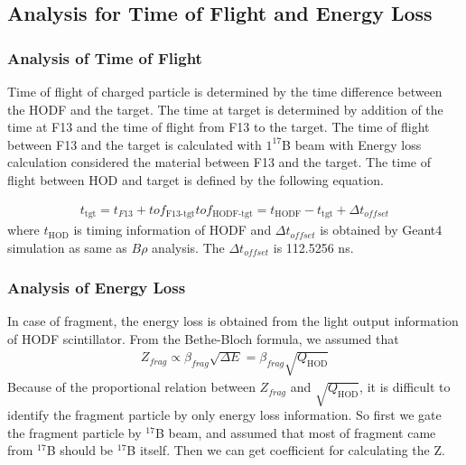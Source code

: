 \subsection{Analysis for Time of Flight and Energy Loss}
\subsubsection{Analysis of Time of Flight}
Time of flight of charged particle is determined by the time difference between the HODF and the target. The time at target is determined by addition of the time at F13 and the time of flight from F13 to the target. The time of flight between F13 and the target is calculated with ${}1^{17}$B beam with Energy loss calculation considered the material between F13 and the target. The time of flight between HOD and target is defined by the following equation.

\begin{align}
    t_{\text{tgt}} = t_{F13} + tof_{\text{F13-tgt}}
    tof_{\text{HODF-tgt}} = t_{\text{HODF}} - t_{\text{tgt}} + \Delta t_{offset}
\end{align}
where $t_{\text{HOD}}$ is timing information of HODF and $\Delta t_{offset}$ is obtained by Geant4 simulation as same as $B\rho$ analysis. The $\Delta t_{offset}$ is 112.5256 ns.

\subsubsection{Analysis of Energy Loss}
In case of fragment, the energy loss is obtained from the light output information of HODF scintillator. From the Bethe-Bloch formula, we assumed that 
\begin{align}
    Z_{frag} \propto \beta_{frag} \sqrt{\Delta E} = \beta_{frag} \sqrt{Q_{\text{HOD}}}
\end{align}
Because of the proportional relation between $Z_{frag}$ and $\sqrt{Q_{\text{HOD}}}$, it is difficult to identify the fragment particle by only energy loss information. So first we gate the fragment particle by ${}^{17}$B beam, and assumed that most of fragment came from ${}^{17}$B should be ${}^{17}$B itself. Then we can get coefficient for calculating the Z.
\begin{align}
\end{align}

